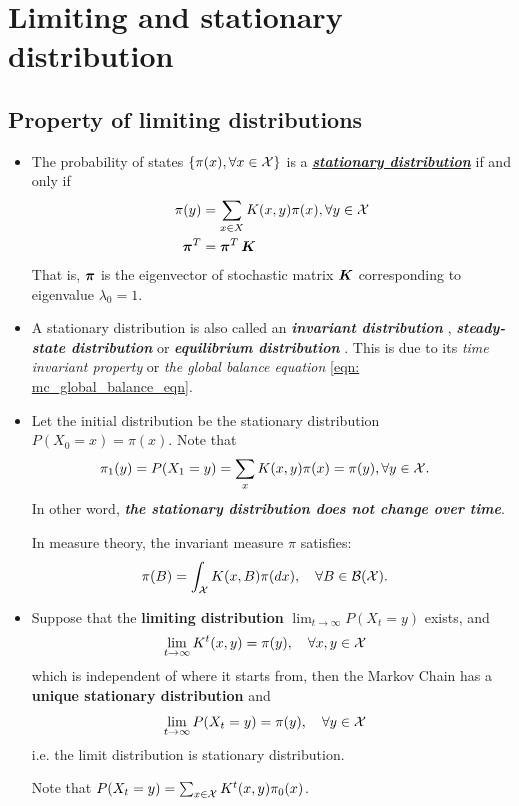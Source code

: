 \documentclass[11pt]{article}
\begin{document}
\section{Limiting and stationary distribution}
\subsection{Property of limiting distributions}
\begin{itemize}
\item \begin{definition}
The probability of states $\left\{\pi(x), \forall x\in {\mathcal X}\right\}$ is a \underline{\textbf{\emph{stationary distribution}}} if and only if 
\begin{align}
\pi(y) &= \sum_{x \in X}K(x, y)\pi(x), \forall y \in {\mathcal X} \label{eqn: mc_stationary}\\
\boldsymbol{\pi}^{T} &= \boldsymbol{\pi}^{T}\,\boldsymbol{K}  \label{eqn: mc_stationary_mat}
\end{align} That is, $\boldsymbol{\pi}$ is the eigenvector of stochastic matrix $\boldsymbol{K}$ corresponding to eigenvalue $\lambda_0 = 1$.
\end{definition}


\item A stationary distribution is also called an \emph{\textbf{invariant distribution}} \citep{robert1999monte, liu2001monte}, \emph{\textbf{steady-state distribution}} \citep{ross2014introduction} or \emph{\textbf{equilibrium distribution}} \citep{brooks2011handbook, ross2014introduction}. This is due to its \emph{time invariant property} or \emph{the global balance equation} \eqref{eqn: mc_global_balance_eqn}.

\item Let the initial distribution be the stationary distribution $P(X_0 = x)= \pi(x)$. Note that 
\begin{align}
\pi_1(y) = P(X_1 = y) &= \sum_{x}K(x, y)\pi(x) = \pi(y), \forall y \in {\mathcal X}.
\end{align} In other word, \emph{\textbf{the stationary distribution does not change over time}}. 

In measure theory, the invariant measure $\pi$ satisfies:
\begin{align*}
\pi(B) &= \int_{{\mathcal X}} K(x, B)\pi(dx), \quad \forall B\in {\mathcal B}({\mathcal X}).
\end{align*}


\item \begin{proposition}\label{thm: limit_stationary}
Suppose that the \textbf{limiting distribution} $\lim_{t\rightarrow \infty}P(X_t = y)$ exists, and 
\begin{align*}
\lim_{t\rightarrow \infty}K^{t}(x, y) &= \pi(y), \quad \forall x, y\in {\mathcal X}
\end{align*} which is independent of where it starts from, then the Markov Chain has a \textbf{unique stationary distribution} and 
\begin{align}
\lim_{t\rightarrow \infty}P(X_t = y) &= \pi(y), \quad \forall y \in {\mathcal X}
\end{align} i.e. the limit distribution is stationary distribution.
\end{proposition} Note that $P(X_t = y) = \sum_{x\in {\mathcal X}}K^{t}(x, y)\pi_0(x)$.


\end{itemize}
\end{document}
